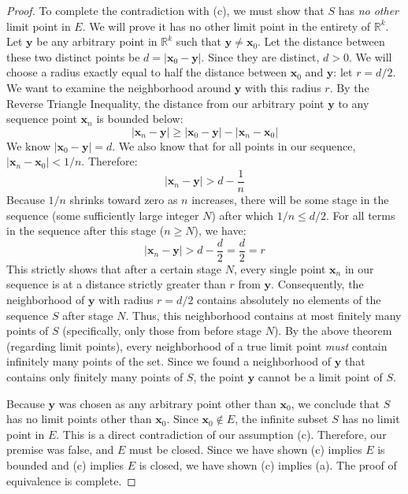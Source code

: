 \documentclass{article}
\theoremstyle{mythm}
\begin{document}
\begin{proof}
To complete the contradiction with (c), we must show that $S$ has \textit{no other} limit point in $E$. We will prove it has no other limit point in the entirety of $\mathbb{R}^k$.
Let $\mathbf{y}$ be any arbitrary point in $\mathbb{R}^k$ such that $\mathbf{y} \neq \mathbf{x}_0$. 
Let the distance between these two distinct points be $d = |\mathbf{x}_0 - \mathbf{y}|$. Since they are distinct, $d > 0$.
We will choose a radius exactly equal to half the distance between $\mathbf{x}_0$ and $\mathbf{y}$: let $r = d/2$. We want to examine the neighborhood around $\mathbf{y}$ with this radius $r$.
By the Reverse Triangle Inequality, the distance from our arbitrary point $\mathbf{y}$ to any sequence point $\mathbf{x}_n$ is bounded below:
\[ |\mathbf{x}_n - \mathbf{y}| \ge |\mathbf{x}_0 - \mathbf{y}| - |\mathbf{x}_n - \mathbf{x}_0| \]
We know $|\mathbf{x}_0 - \mathbf{y}| = d$. We also know that for all points in our sequence, $|\mathbf{x}_n - \mathbf{x}_0| < 1/n$. Therefore:
\[ |\mathbf{x}_n - \mathbf{y}| > d - \frac{1}{n} \]
Because $1/n$ shrinks toward zero as $n$ increases, there will be some stage in the sequence (some sufficiently large integer $N$) after which $1/n \le d/2$. 
For all terms in the sequence after this stage ($n \ge N$), we have:
\[ |\mathbf{x}_n - \mathbf{y}| > d - \frac{d}{2} = \frac{d}{2} = r \]
This strictly shows that after a certain stage $N$, every single point $\mathbf{x}_n$ in our sequence is at a distance strictly greater than $r$ from $\mathbf{y}$. 
Consequently, the neighborhood of $\mathbf{y}$ with radius $r = d/2$ contains absolutely no elements of the sequence $S$ after stage $N$. Thus, this neighborhood contains at most finitely many points of $S$ (specifically, only those from before stage $N$).
By the above theorem (regarding limit points), every neighborhood of a true limit point \textit{must} contain infinitely many points of the set. Since we found a neighborhood of $\mathbf{y}$ that contains only finitely many points of $S$, the point $\mathbf{y}$ cannot be a limit point of $S$.

Because $\mathbf{y}$ was chosen as any arbitrary point other than $\mathbf{x}_0$, we conclude that $S$ has no limit points other than $\mathbf{x}_0$. 
Since $\mathbf{x}_0 \notin E$, the infinite subset $S$ has no limit point in $E$. 
This is a direct contradiction of our assumption (c). Therefore, our premise was false, and $E$ must be closed. 
Since we have shown (c) implies $E$ is bounded and (c) implies $E$ is closed, we have shown (c) implies (a). 
The proof of equivalence is complete.
\end{proof}
\end{document}
